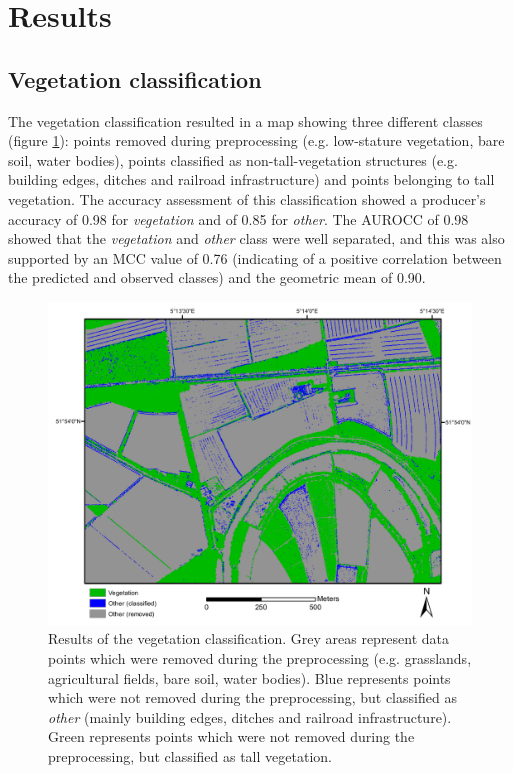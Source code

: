 \section{Results}
\subsection{Vegetation classification}
The vegetation classification resulted in a map showing three different classes (figure \ref{fig:classification}): points removed during preprocessing (e.g. low-stature vegetation, bare soil, water bodies), points classified as non-tall-vegetation structures (e.g. building edges, ditches and railroad infrastructure) and points belonging to tall vegetation. The accuracy assessment of this classification showed a producer's accuracy of 0.98 for \textit{vegetation} and of 0.85 for \textit{other}. The AUROCC of 0.98 showed that the \textit{vegetation} and \textit{other} class were well separated, and this was also supported by an MCC value of 0.76 (indicating of a positive correlation between the predicted and observed classes) and the geometric mean of 0.90.

\begin{figure}
	\centering
	\includegraphics[width=\columnwidth]{./img/classification.pdf}
	\caption{Results of the vegetation classification. Grey areas represent data points which were removed during the preprocessing (e.g. grasslands, agricultural fields, bare soil, water bodies). Blue represents points which were not removed during the preprocessing, but classified as \textit{other} (mainly building edges, ditches and railroad infrastructure). Green represents points which were not removed during the preprocessing, but classified as tall vegetation.}
	\label{fig:classification}
\end{figure}

